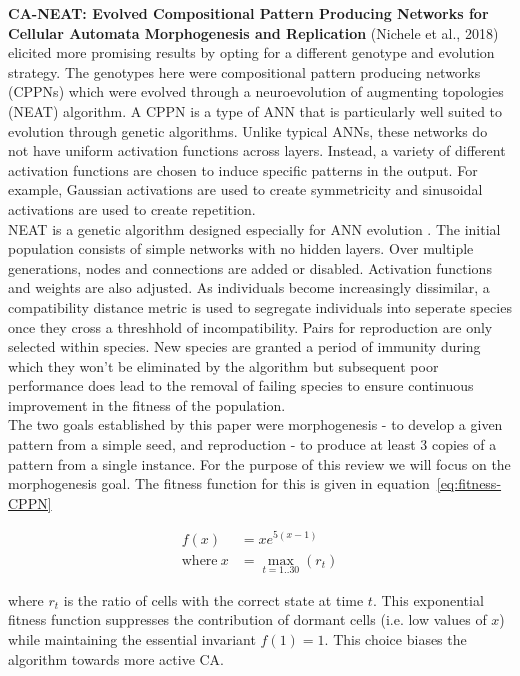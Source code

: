 \raggedbottom
\pagebreak

\noindent
\textbf{CA-NEAT: Evolved Compositional Pattern Producing Networks for Cellular Automata Morphogenesis and Replication} (Nichele et al., 2018) \cite{nichele2017neat} elicited more promising results by opting for a different genotype and evolution strategy.
The genotypes here were compositional pattern producing networks (CPPNs) which were evolved through a neuroevolution of augmenting topologies (NEAT) algorithm.
A CPPN is a type of ANN that is particularly well suited to evolution through genetic algorithms.
Unlike typical ANNs, these networks do not have uniform activation functions across layers.
Instead, a variety of different activation functions are chosen to induce specific patterns in the output.
For example, Gaussian activations are used to create symmetricity and sinusoidal activations are used to create repetition.\\

NEAT is a genetic algorithm designed especially for ANN evolution \cite{stanley2002evolving}.
The initial population consists of simple networks with no hidden layers.
Over multiple generations, nodes and connections are added or disabled.
Activation functions and weights are also adjusted.
As individuals become increasingly dissimilar, a compatibility distance metric is used to segregate individuals into seperate species once they cross a threshhold of incompatibility.
Pairs for reproduction are only selected within species.
New species are granted a period of immunity during which they won't be eliminated by the algorithm but subsequent poor performance does lead to the removal of failing species to ensure continuous improvement in the fitness of the population.\\

The two goals established by this paper were morphogenesis - to develop a given pattern from a simple seed, and reproduction - to produce at least 3 copies of a pattern from a single instance.
For the purpose of this review we will focus on the morphogenesis goal.
The fitness function for this is given in equation~\ref{eq:fitness-CPPN}

\begin{align}
\label{eq:fitness-CPPN}
f(x) &= xe^{5(x-1)} \\
\text{where}~x &= \max_{t = 1 .. 30} (r_t)
\end{align}

\noindent
where $r_t$ is the ratio of cells with the correct state at time $t$.
This exponential fitness function suppresses the contribution of dormant cells (i.e. low values of $x$) while maintaining the essential invariant $f(1) = 1$.
This choice biases the algorithm towards more active CA.\\


